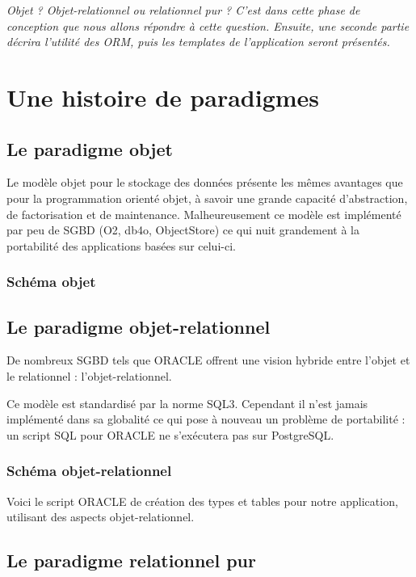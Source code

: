\textit{Objet ? Objet-relationnel ou relationnel pur ? C'est dans cette phase de conception que nous allons répondre à cette question. Ensuite, une seconde partie décrira l'utilité des ORM, puis les templates de l'application seront présentés.}

\section{Une histoire de paradigmes}
\subsection{Le paradigme objet}

Le modèle objet pour le stockage des données présente les mêmes avantages que pour la programmation orienté objet, à savoir une grande capacité d'abstraction, de factorisation et de maintenance. Malheureusement ce modèle est implémenté par peu de SGBD (O2, db4o, ObjectStore) ce qui nuit grandement à la portabilité des applications basées sur celui-ci.

\subsubsection{Schéma objet}


\subsection{Le paradigme objet-relationnel}

De nombreux SGBD tels que ORACLE offrent une vision hybride entre l'objet et le relationnel : l'objet-relationnel.

Ce modèle est standardisé par la norme SQL3. Cependant il n'est jamais implémenté dans sa globalité ce qui pose à nouveau un problème de portabilité : un script SQL pour ORACLE ne s'exécutera pas sur PostgreSQL.

\subsubsection{Schéma objet-relationnel}

Voici le script ORACLE de création des types et tables pour notre application, utilisant des aspects objet-relationnel.


\subsection{Le paradigme relationnel pur}

